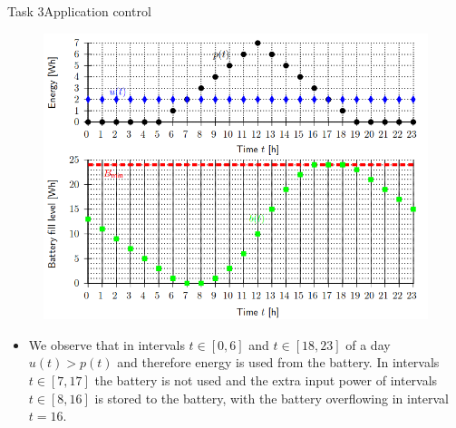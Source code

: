 \begin{frame}[allowframebreaks]{Task 3}{Application control}
  \begin{figure}
      \centering
      \includegraphics[scale=0.4]{figures/energyUsage.PNG}
  \end{figure}
  \begin{Sidenote}
    \begin{itemize}
      \item We observe that in intervals $t \in[0,6]$ and $t \in[18,23]$ of a day $u(t)>p(t)$ and therefore energy is used from the battery. In intervals $t \in[7,17]$ the battery is not used and the extra input power of intervals $t \in[8,16]$ is stored to the battery, with the battery overflowing in interval $t=16$.
    \end{itemize}
  \end{Sidenote}
\end{frame}
